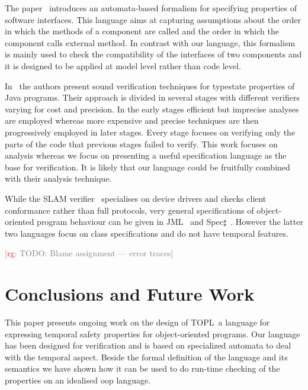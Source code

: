 \documentclass[preprint]{sigplanconf} %
\newcommand{\TPL}{TOPL}
\newcommand{\note}[2]{\textcolor{gray}{[\textcolor{red}{#1}: #2]}}
\newcommand{\rg}[1]{\note{rg}{#1}}
\theoremstyle{definition}
\theoremstyle{remark}
\begin{document}
The paper~\cite{dblp:conf/sigsoft/AlfaroH01} introduces an automata-based formalism for specifying properties of software interfaces.
This language aims at capturing assumptions about the order in which the methods of a component are called and the order in which the component calls external method.
In contrast with our language, this formalism is mainly used to check the compatibility of the interfaces of two components and it is designed to be applied at  model level rather than code level.

In~\cite{dblp:conf/issta/FinkYDRG06} the authors present sound verification techniques for typestate properties of Java  programs.
Their approach is divided in several stages with different verifiers varying for cost and precision.
In the early stages efficient but imprecise analyses are employed whereas
more expensive and precise techniques are then progressively employed in later stages.
Every stage focuses on verifying only the parts of the code that previous stages failed to verify.
This work focuses on analysis whereas we focus on presenting a useful specification language as the base for verification.
It is likely that our language could be fruitfully combined with their analysis technique.

While the SLAM verifier~\cite{dblp:conf/cav/ballr01} specialises on device drivers and checks client conformance rather than full protocols, 
very general specifications of object-oriented program behaviour can be given in JML~\cite{jml} and Spec$\sharp$~\cite{DBLP:journals/jot/BarnettDFLS04}. However the latter two languages focus on class specifications and do not have temporal features.


\rg{TODO: Blame assignment --- error traces}


\section{Conclusions and Future Work}\label{sec:conclusions} %
This paper presents ongoing work on the design of  \TPL \ a language for expressing temporal safety properties for object-oriented programs.
Our language has been designed for verification and is based on specialized automata to deal with the temporal aspect.
Beside the formal definition of the language and its semantics we have shown how it can be used to do run-time checking of the properties
on an idealised oop language.
\end{document}
